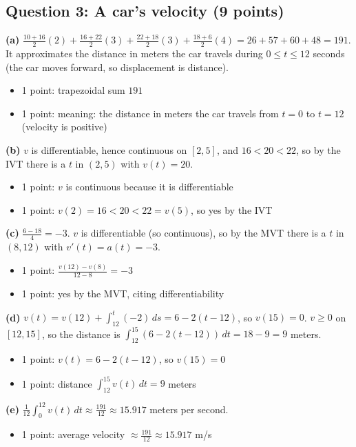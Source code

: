 \documentclass{apcalc}
\begin{document}
\subsection*{Question 3: A car's velocity (9 points)}
\textbf{(a)} $\frac{10+16}{2}(2)+\frac{16+22}{2}(3)+\frac{22+18}{2}(3)+\frac{18+6}{2}(4)=26+57+60+48=191$. It approximates the distance in meters the car travels during $0\le t\le12$ seconds (the car moves forward, so displacement is distance).
\begin{itemize}[leftmargin=1.6em,itemsep=0pt]
\item 1 point: trapezoidal sum $191$
\item 1 point: meaning: the distance in meters the car travels from $t=0$ to $t=12$ (velocity is positive)
\end{itemize}
\textbf{(b)} $v$ is differentiable, hence continuous on $[2,5]$, and $16<20<22$, so by the IVT there is a $t$ in $(2,5)$ with $v(t)=20$.
\begin{itemize}[leftmargin=1.6em,itemsep=0pt]
\item 1 point: $v$ is continuous because it is differentiable
\item 1 point: $v(2)=16<20<22=v(5)$, so yes by the IVT
\end{itemize}
\textbf{(c)} $\frac{6-18}{4}=-3$. $v$ is differentiable (so continuous), so by the MVT there is a $t$ in $(8,12)$ with $v'(t)=a(t)=-3$.
\begin{itemize}[leftmargin=1.6em,itemsep=0pt]
\item 1 point: $\frac{v(12)-v(8)}{12-8}=-3$
\item 1 point: yes by the MVT, citing differentiability
\end{itemize}
\textbf{(d)} $v(t)=v(12)+\int_{12}^t(-2)\,ds=6-2(t-12)$, so $v(15)=0$. $v\ge0$ on $[12,15]$, so the distance is $\int_{12}^{15}(6-2(t-12))\,dt=18-9=9$ meters.
\begin{itemize}[leftmargin=1.6em,itemsep=0pt]
\item 1 point: $v(t)=6-2(t-12)$, so $v(15)=0$
\item 1 point: distance $\int_{12}^{15}v(t)\,dt=9$ meters
\end{itemize}
\textbf{(e)} $\frac{1}{12}\int_0^{12}v(t)\,dt\approx\frac{191}{12}\approx15.917$ meters per second.
\begin{itemize}[leftmargin=1.6em,itemsep=0pt]
\item 1 point: average velocity $\approx\frac{191}{12}\approx15.917$ m/s
\end{itemize}
\end{document}
